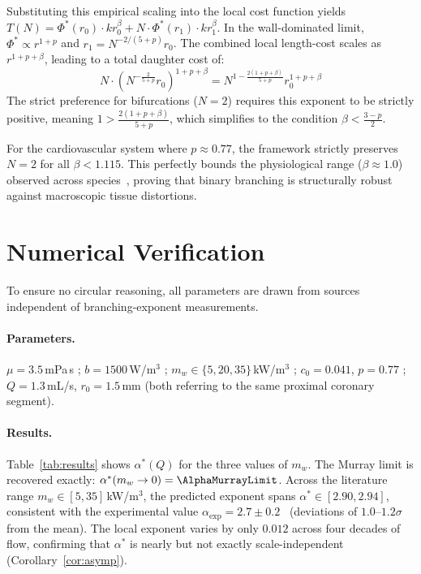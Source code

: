 \documentclass[11pt,a4paper]{article}
\theoremstyle{remark}
\begin{document}
Substituting this empirical scaling into the local cost function yields $T(N) =
\Phi^*(r_0)\cdot k r_0^\beta + N\cdot \Phi^*(r_1)\cdot k r_1^\beta$. In the
wall-dominated limit, $\Phi^* \propto r^{1+p}$ and $r_1 = N^{-2/(5+p)} r_0$. The
combined local length-cost scales as $r^{1+p+\beta}$, leading to a total
daughter cost of:
\begin{equation}
N \cdot \left(N^{-\frac{2}{5+p}} r_0\right)^{1+p+\beta} = N^{1 - \frac{2(1+p+\beta)}{5+p}} r_0^{1+p+\beta}
\end{equation}
The strict preference for bifurcations ($N=2$) requires this exponent to be
strictly positive, meaning $1 > \frac{2(1+p+\beta)}{5+p}$, which simplifies to
the condition $\beta < \frac{3-p}{2}$.

For the cardiovascular system where $p \approx 0.77$, the framework strictly
preserves $N=2$ for all $\beta < 1.115$. This perfectly bounds the physiological
range ($\beta \approx 1.0$) observed across species~\cite{Kassab1993}, proving
that binary branching is structurally robust against macroscopic tissue
distortions.

\section{Numerical Verification}
\label{sec:numerical}

To ensure no circular reasoning, all parameters are drawn from sources
independent of branching-exponent measurements.

\paragraph{Parameters.}
$\mu=3.5$\,mPa\,s \cite{Caro1978};
$b=1500$\,W/$\mathrm{m}^3$ \cite{Murray1926,Taber1998};
$m_w\in\{5,20,35\}$\,kW/$\mathrm{m}^3$ \cite{Paul1980};
$c_0=0.041$, $p=0.77$ \cite{Rhodin1967,Nichols2011,WolinskyGlagov1967};
$Q=1.3$\,mL/s, $r_0=1.5$\,mm \cite{Kassab1993}
(both referring to the same proximal coronary segment).

\paragraph{Results.}
Table~\ref{tab:results} shows $\alpha^*(Q)$ for the three values of $m_w$.
The Murray limit is recovered exactly: $\alpha^*(m_w\to0)=\AlphaMurrayLimit$.
Across the literature range $m_w\in[5,35]$\,kW/$\mathrm{m}^3$,
the predicted exponent spans $\alpha^*\in[2.90,2.94]$,
consistent with the experimental value
$\alpha_\mathrm{exp}=2.7\pm0.2$~\cite{Kassab1993}
(deviations of $1.0$--$1.2\sigma$ from the mean).
The local exponent varies by only $0.012$ across four decades of flow,
confirming that $\alpha^*$ is nearly but not exactly scale-independent
(Corollary~\ref{cor:asymp}).
\end{document}
